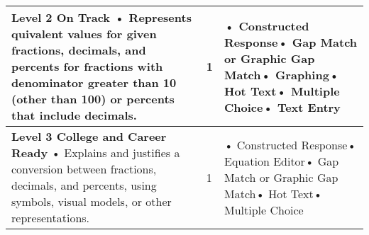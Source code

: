 \documentclass[11pt, English]{article}
\begin{document}
\begin{longtable}{|p{11.0cm}|p{1.8cm}|p{3.7cm}|}
\textbf{Level 2 On Track}\newline
• Represents quivalent values for given fractions, decimals, and percents for fractions with denominator greater than 10 (other than 100) or percents that include decimals. \newline

 & \hfil{1}
 &• Constructed Response\newline• Gap Match or Graphic Gap Match\newline• Graphing\newline• Hot Text\newline• Multiple Choice\newline• Text Entry\\
\hline


 
\textbf{Level 3 College and Career Ready}\newline
• Explains and justifies a conversion between fractions, decimals, and percents, using symbols, visual models, or other representations.\newline

& \hfil{1}
&• Constructed Response\newline• Equation Editor\newline• Gap Match or Graphic Gap Match\newline• Hot Text\newline• Multiple Choice\\
\hline 


\end{longtable}
\end{document}

